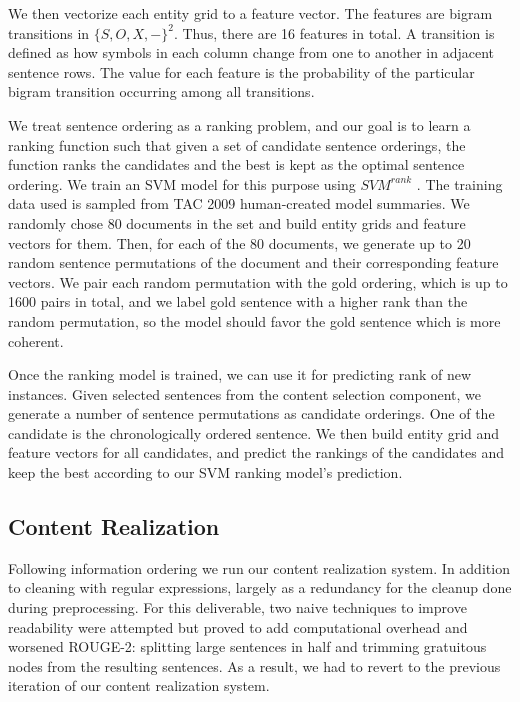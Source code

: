 \documentclass[11pt,a4paper]{article}
\begin{document}
We then vectorize each entity grid to a feature vector. The features are bigram transitions in $\{S,O,X,-\}^2$. Thus, there are 16 features in total. A transition is defined as how symbols in each column change from one to another in adjacent sentence rows. The value for each feature is the probability of the particular bigram transition occurring among all transitions.

We treat sentence ordering as a ranking problem, and our goal is to learn a ranking function such that given a set of candidate sentence orderings, the function ranks the candidates and the best is kept as the optimal sentence ordering. We train an SVM model for this purpose using $SVM^{rank}$ \citep{joachims2006training}. The training data used is sampled from TAC 2009 human-created model summaries. We randomly chose 80 documents in the set and build entity grids and feature vectors for them. Then, for each of the 80 documents, we generate up to 20 random sentence permutations of the document and their corresponding feature vectors. We pair each random permutation with the gold ordering, which is up to 1600 pairs in total, and we label gold sentence with a higher rank than the random permutation, so the model should favor the gold sentence which is more coherent.

Once the ranking model is trained, we can use it for predicting rank of new instances. Given selected sentences from the content selection component, we generate a number of sentence permutations as candidate orderings. One of the candidate is the chronologically ordered sentence. We then build entity grid and feature vectors for all candidates, and predict the rankings of the candidates and keep the best according to our SVM ranking model's prediction. 
\subsection{Content Realization}
Following information ordering we run our content realization system. In addition to cleaning with regular expressions, largely as a redundancy for the cleanup done during preprocessing. For this deliverable, two naive techniques to improve readability were attempted but proved to add computational overhead and worsened ROUGE-2: splitting large sentences in half and trimming gratuitous nodes from the resulting sentences. As a result, we had to revert to the previous iteration of our content realization system.
\end{document}
